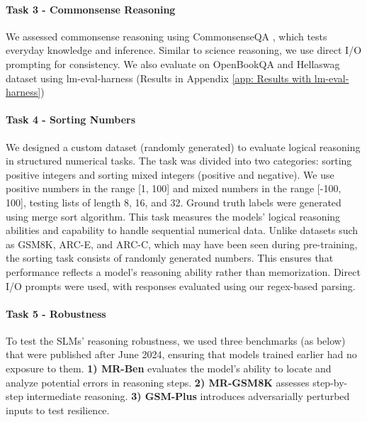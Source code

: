 \paragraph{Task 3 - Commonsense Reasoning} We assessed commonsense reasoning using CommonsenseQA \cite{talmor-etal-2019-commonsenseqa}, which tests everyday knowledge and inference. Similar to science reasoning, we use direct I/O prompting for consistency. We also evaluate on OpenBookQA \cite{OpenBookQA2018} and Hellaswag \cite{zellers2019hellaswag} dataset using lm-eval-harness (Results in Appendix \ref{app: Results with lm-eval-harness})

\paragraph{Task 4 - Sorting Numbers} We designed a custom dataset (randomly generated) to evaluate logical reasoning in structured numerical tasks. The task was divided into two categories: sorting positive integers and sorting mixed integers (positive and negative). We use positive numbers in the range [1, 100] and mixed numbers in the range [-100, 100], testing lists of length 8, 16, and 32. Ground truth labels were generated using merge sort algorithm. 
This task measures the models’ logical reasoning abilities and capability to handle sequential numerical data. Unlike datasets such as GSM8K, ARC-E, and ARC-C, which may have been seen during pre-training, the sorting task consists of randomly generated numbers. This ensures that performance reflects a model’s reasoning ability rather than memorization. Direct I/O prompts were used, with responses evaluated using our regex-based parsing.

\paragraph{Task 5 - Robustness} To test the SLMs' reasoning robustness, we used three benchmarks (as below) that were published after June 2024, ensuring that models trained earlier had no exposure to them. \textbf{1) MR-Ben} evaluates the model's ability to locate and analyze potential errors in reasoning steps. \textbf{2) MR-GSM8K} assesses step-by-step intermediate reasoning. \textbf{3) GSM-Plus} introduces adversarially perturbed inputs to test resilience.
